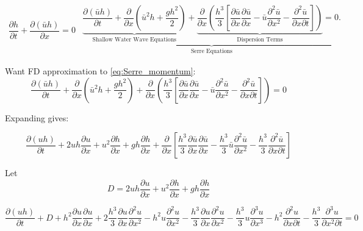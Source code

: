 \documentclass{article}
\begin{document}
\begin{subequations}\label{eq:Serre_conservative_form}
\begin{gather}
\dfrac{\partial h}{\partial t} + \dfrac{\partial (\bar{u}h)}{\partial x} = 0
\label{eq:Serre_continuity}
\end{gather}
\begin{gather}
\underbrace{\underbrace{\dfrac{\partial (\bar{u}h)}{\partial t} + \dfrac{\partial}{\partial x} \left ( \bar{u}^2h + \dfrac{gh^2}{2}\right )}_{\text{Shallow Water Wave Equations}} + \underbrace{\dfrac{\partial}{\partial x} \left (  \dfrac{h^3}{3} \left [ \dfrac{\partial \bar{u} }{\partial x} \dfrac{\partial \bar{u}}{\partial x} - \bar{u} \dfrac{\partial^2 \bar{u}}{\partial x^2}  - \dfrac{\partial^2 \bar{u}}{\partial x \partial t}\right ] \right )}_{\text{Dispersion Terms}} = 0.}_{\text{Serre Equations}}
\label{eq:Serre_momentum}
\end{gather}
\end{subequations}


Want FD approximation to \eqref{eq:Serre_momentum}:
$$\dfrac{\partial (\bar{u}h)}{\partial t} + \dfrac{\partial}{\partial x} \left ( \bar{u}^2h + \dfrac{gh^2}{2}\right ) + \dfrac{\partial}{\partial x} \left (  \dfrac{h^3}{3} \left [ \dfrac{\partial \bar{u} }{\partial x} \dfrac{\partial \bar{u}}{\partial x} - \bar{u} \dfrac{\partial^2 \bar{u}}{\partial x^2}  - \dfrac{\partial^2 \bar{u}}{\partial x \partial t}\right ] \right ) = 0$$

Expanding gives:

$$\dfrac{\partial (uh)}{\partial t} + 2uh\frac{\partial u}{\partial x} + u^2\frac{\partial h}{\partial x} + gh\frac{\partial h}{\partial x} + \frac{\partial}{\partial x}\left[\frac{ h^3}{3}\dfrac{\partial \bar{u} }{\partial x} \dfrac{\partial \bar{u}}{\partial x} - \frac{ h^3}{3}\bar{u} \dfrac{\partial^2 \bar{u}}{\partial x^2}  - \frac{ h^3}{3}\dfrac{\partial^2 \bar{u}}{\partial x \partial t}\right]   $$

Let 
\[D = 2uh\frac{\partial u}{\partial x} + u^2\frac{\partial h}{\partial x} + gh\frac{\partial h}{\partial x} \]

$$\dfrac{\partial (uh)}{\partial t} + D + h^2\frac{\partial u}{\partial x}\frac{\partial u}{\partial x} + 2\frac{h^3}{3}\frac{\partial u}{\partial x}\frac{\partial^2 u}{\partial x^2} - h^2u\frac{\partial^2 u}{\partial x^2} - \frac{h ^3}{3}\frac{\partial u}{\partial x}\frac{\partial^2 u}{\partial x^2}- \frac{h^3}{3}u\frac{\partial^3 u}{\partial x^3} - h^2\frac{\partial^2 u}{\partial x \partial t} - \frac{h^3}{3}\frac{\partial^3 u}{\partial x^2 \partial t}  =0        $$
\end{document}
